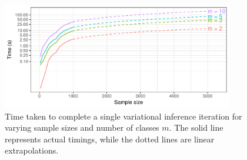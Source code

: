 \documentclass[showframe,11pt,twoside,openright]{report}
\begin{document}
\begin{figure}[hbt]
  \centering
  \includegraphics[width=0.9\textwidth]{figure/05-iprobit_runtime}
  \caption[Time taken to complete a single variational inference iteration]{Time taken to complete a single variational inference iteration for varying sample sizes and number of classes $m$. The solid line represents actual timings, while the dotted lines are linear extrapolations.}
\end{figure}
\end{document}

